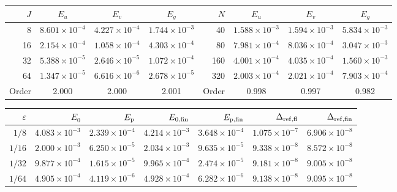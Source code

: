 \begin{tabular}{rccc|rccc}
\hline
$J$ & $E_u$ & $E_v$ & $E_g$
& $N$ & $E_u$ & $E_v$ & $E_g$\\
\hline
8
& $8.601\!\times\!10^{-4}$
& $4.227\!\times\!10^{-4}$
& $1.744\!\times\!10^{-3}$
& 40
& $1.588\!\times\!10^{-3}$
& $1.594\!\times\!10^{-3}$
& $5.834\!\times\!10^{-3}$\\
16
& $2.154\!\times\!10^{-4}$
& $1.058\!\times\!10^{-4}$
& $4.303\!\times\!10^{-4}$
& 80
& $7.981\!\times\!10^{-4}$
& $8.036\!\times\!10^{-4}$
& $3.047\!\times\!10^{-3}$\\
32
& $5.388\!\times\!10^{-5}$
& $2.646\!\times\!10^{-5}$
& $1.072\!\times\!10^{-4}$
& 160
& $4.001\!\times\!10^{-4}$
& $4.035\!\times\!10^{-4}$
& $1.560\!\times\!10^{-3}$\\
64
& $1.347\!\times\!10^{-5}$
& $6.616\!\times\!10^{-6}$
& $2.678\!\times\!10^{-5}$
& 320
& $2.003\!\times\!10^{-4}$
& $2.021\!\times\!10^{-4}$
& $7.903\!\times\!10^{-4}$\\
Order & 2.000 & 2.000 & 2.001
& Order & 0.998 & 0.997 & 0.982\\
\hline
\end{tabular}

\begin{tabular}{rrrrrrr}
\hline
$\varepsilon$ & $E_0$ & $E_{\rm p}$
& $E_{0,\rm fin}$ & $E_{{\rm p},\rm fin}$
& $\Delta_{\rm ref,fl}$ & $\Delta_{\rm ref,fin}$\\
\hline
$1/8$
& $4.083\times10^{-3}$ & $2.339\times10^{-4}$
& $4.214\times10^{-3}$ & $3.648\times10^{-4}$
& $1.075\times10^{-7}$ & $6.906\times10^{-8}$\\
$1/16$
& $2.000\times10^{-3}$ & $6.250\times10^{-5}$
& $2.034\times10^{-3}$ & $9.635\times10^{-5}$
& $9.338\times10^{-8}$ & $8.572\times10^{-8}$\\
$1/32$
& $9.877\times10^{-4}$ & $1.615\times10^{-5}$
& $9.965\times10^{-4}$ & $2.474\times10^{-5}$
& $9.181\times10^{-8}$ & $9.005\times10^{-8}$\\
$1/64$
& $4.905\times10^{-4}$ & $4.119\times10^{-6}$
& $4.928\times10^{-4}$ & $6.282\times10^{-6}$
& $9.138\times10^{-8}$ & $9.095\times10^{-8}$\\
\hline
\end{tabular}

